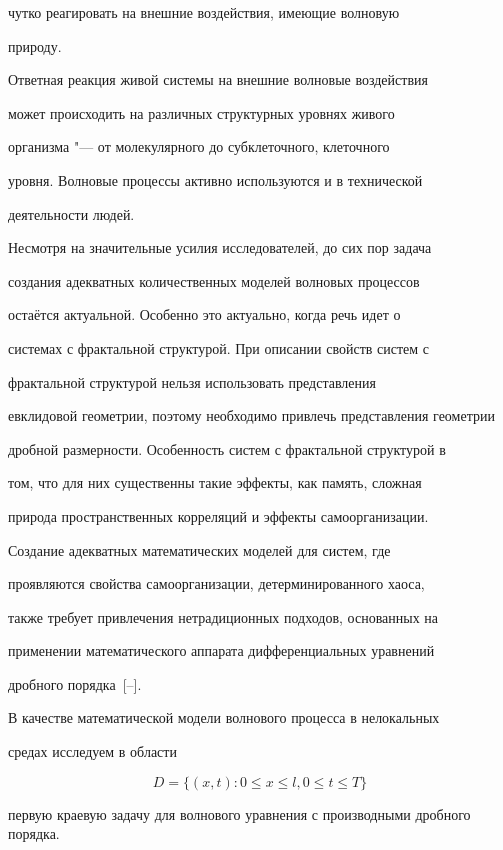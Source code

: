 чутко реагировать на внешние воздействия, имеющие волновую

природу.



Ответная реакция живой системы на внешние волновые воздействия

может происходить на различных структурных уровнях живого

организма "--- от молекулярного до субклеточного, клеточного

уровня. Волновые процессы активно используются и в технической

деятельности людей.



Несмотря на значительные усилия исследователей, до сих пор задача

создания адекватных количественных моделей волновых процессов

остаётся актуальной. Особенно это актуально, когда речь идет о

системах с фрактальной структурой. При описании свойств систем с

фрактальной структурой нельзя использовать представления

евклидовой геометрии, поэтому необходимо привлечь представления геометрии

дробной размерности. Особенность систем с фрактальной структурой в

том, что для них существенны такие эффекты, как память, сложная

природа пространственных корреляций и эффекты самоорганизации.

Создание адекватных математических моделей для систем, где

проявляются свойства самоорганизации, детерминированного хаоса,

также требует привлечения нетрадиционных подходов, основанных на

применении математического аппарата дифференциальных уравнений

дробного порядка~[--].



В качестве математической модели волнового процесса в нелокальных

средах исследуем в области 

$$D=\{(x, t ) : 0\leq x\leq l, 0\leq t\leq T\}$$ 

первую краевую задачу для волнового уравнения с производными дробного порядка.



